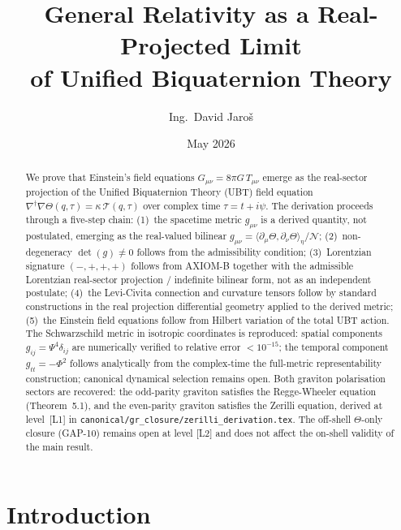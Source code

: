 \documentclass[12pt,a4paper]{article}
\title{\textbf{General Relativity as a Real-Projected Limit\\
       of Unified Biquaternion Theory}}
\author{Ing.\ David Jaroš}
\date{May 2026}
\theoremstyle{definition}
\theoremstyle{remark}
\newcommand{\calN}{\mathcal{N}}
\begin{document}
\maketitle

\begin{abstract}
We prove that Einstein's field equations $G_{\mu\nu} = 8\pi G\,T_{\mu\nu}$
emerge as the real-sector projection of the Unified Biquaternion Theory (UBT)
field equation
$\nabla^\dagger\nabla\Theta(q,\tau) = \kappa\,\mathcal{T}(q,\tau)$
over complex time $\tau = t + i\psi$.
The derivation proceeds through a five-step chain:
(1)~the spacetime metric $g_{\mu\nu}$ is a derived quantity, not postulated,
emerging as the real-valued bilinear
$g_{\mu\nu} = \langle\partial_\mu\Theta,\partial_\nu\Theta\rangle_\eta/\calN$;
(2)~non-degeneracy $\det(g) \neq 0$ follows from the admissibility condition;
(3)~Lorentzian signature $(-,+,+,+)$ follows from AXIOM-B together with the admissible Lorentzian real-sector projection / indefinite bilinear form, not as an independent postulate;
(4)~the Levi-Civita connection and curvature tensors follow by standard constructions in the real projection
differential geometry applied to the derived metric;
(5)~the Einstein field equations follow from Hilbert variation of the total
UBT action.
The Schwarzschild metric in isotropic coordinates is reproduced:
spatial components $g_{ij} = \Psi^4\delta_{ij}$ are numerically
verified to relative error $< 10^{-15}$; the temporal component
$g_{tt} = -\Phi^2$ follows analytically from the complex-time
the full-metric representability construction; canonical dynamical selection remains open.
Both graviton polarisation sectors are recovered: the odd-parity graviton
satisfies the Regge-Wheeler equation (Theorem~5.1), and the even-parity
graviton satisfies the Zerilli equation, derived at level~[L1] in
\texttt{canonical/gr\_closure/zerilli\_derivation.tex}.
The off-shell $\Theta$-only closure (GAP-10) remains open at level [L2]
and does not affect the on-shell validity of the main result.
\end{abstract}

\tableofcontents
\bigskip\bigskip

\section{Introduction}
\label{sec:intro}
\end{document}
